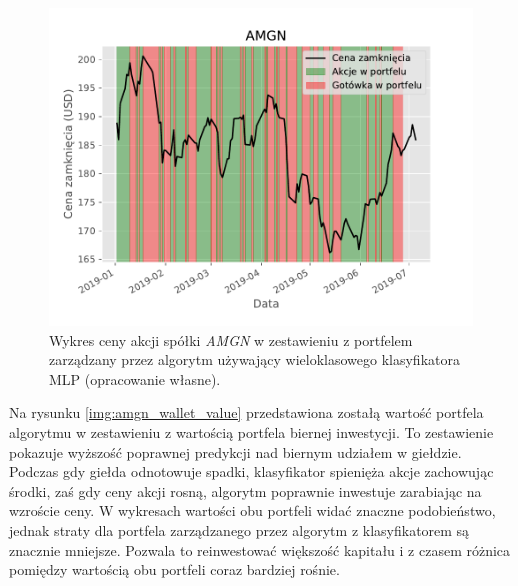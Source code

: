 \documentclass[a4paper, twoside, 11pt, openright]{article}
\begin{document}
\begin{figure}[H]
\centering \includegraphics[scale=1.1]{img/AMGN-buy_and_sell_plot.pdf}
\caption{Wykres ceny akcji spółki \textit{AMGN} w zestawieniu z portfelem zarządzany przez algorytm używający wieloklasowego klasyfikatora MLP (opracowanie własne).}
\label{img:amgn_wallet_buy_sell}
\end{figure}

Na rysunku \ref{img:amgn_wallet_value} przedstawiona zostałą wartość portfela algorytmu w zestawieniu z wartością portfela biernej inwestycji. To zestawienie pokazuje wyższość poprawnej predykcji nad biernym udziałem w giełdzie. Podczas gdy giełda odnotowuje spadki, klasyfikator spienięża akcje zachowując środki, zaś gdy ceny akcji rosną, algorytm poprawnie inwestuje zarabiając na wzroście ceny. W wykresach wartości obu portfeli widać znaczne podobieństwo, jednak straty dla portfela zarządzanego przez algorytm z klasyfikatorem są znacznie mniejsze. Pozwala to reinwestować większość kapitału i z czasem różnica pomiędzy wartością obu portfeli coraz bardziej rośnie.
\end{document}
